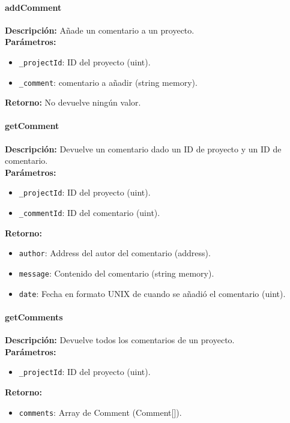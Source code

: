 \paragraph{addComment}
\noindent
\textbf{Descripción:}
Añade un comentario a un proyecto. \\
\textbf{Parámetros:}
\begin{itemize}
    \item \texttt{\_projectId}: ID del proyecto (uint).
    \item \texttt{\_comment}: comentario a añadir (string memory).
\end{itemize}
\textbf{Retorno:}
No devuelve ningún valor.

\paragraph{getComment}
\noindent
\textbf{Descripción:}
Devuelve un comentario dado un ID de proyecto y un ID de comentario. \\
\textbf{Parámetros:}
\begin{itemize}
    \item \texttt{\_projectId}: ID del proyecto (uint).
    \item \texttt{\_commentId}: ID del comentario (uint).
\end{itemize}
\textbf{Retorno:}
\begin{itemize}
    \item \texttt{author}: Address del autor del comentario (address).
    \item \texttt{message}: Contenido del comentario (string memory).
    \item \texttt{date}: Fecha en formato UNIX de cuando se añadió el comentario (uint).
\end{itemize}


\paragraph{getComments}
\noindent
\textbf{Descripción:}
Devuelve todos los comentarios de un proyecto. \\
\textbf{Parámetros:}
\begin{itemize}
    \item \texttt{\_projectId}: ID del proyecto (uint).
\end{itemize}
\textbf{Retorno:}
\begin{itemize}
    \item \texttt{comments}: Array de Comment (Comment[]).
\end{itemize}


